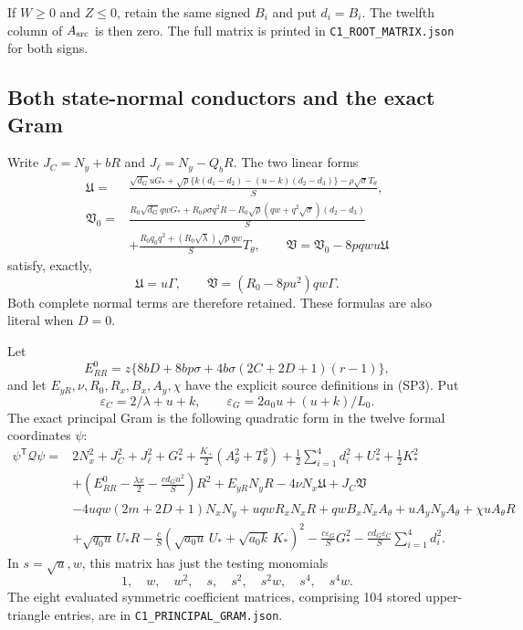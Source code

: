 If $W\ge0$ and $Z\le0$, retain the same signed $B_i$ and put $d_i=B_i$.
The twelfth column of $A_{\rm src}$ is then zero. The full matrix is
printed in \texttt{C1\_ROOT\_MATRIX.json} for both signs.

\subsection{Both state-normal conductors and the exact Gram}

Write $J_C=N_y+bR$ and $J_\ell=N_y-Q_bR$. The two linear forms
\begin{align*}
 \mathfrak U={}&\frac{\sqrt{d_G}uG_*
 +\sqrt\rho\{k(d_1-d_2)-(u-k)(d_2-d_3)\}
 -\rho\sqrt\sigma T_\theta}{S},\\
 \mathfrak V_0={}&\frac{R_0\sqrt{d_G}qwG_*+R_0\rho\sigma q^2R
 -R_0\sqrt\rho(qw+q^2\sqrt\sigma)(d_2-d_3)}{S}\\
 &+\frac{R_0q_0q^2+(R_0\sqrt\lambda)\sqrt\rho qw}{S}T_\theta,
 \qquad \mathfrak V=\mathfrak V_0-8pqwu\mathfrak U
\end{align*}
satisfy, exactly,
\[
 \mathfrak U=u\Gamma,\qquad
 \mathfrak V=(R_0-8pu^2)qw\Gamma.
\]
Both complete normal terms are therefore retained. These formulas
are also literal when $D=0$.

Let
\[
 E_{RR}^0=z\{8bD+8bp\sigma+4b\sigma(2C+2D+1)(r-1)\},
\]
and let $E_{yR},\nu,R_0,R_x,B_x,A_y,\chi$ have the explicit source
definitions in (SP3). Put
\[
 \varepsilon_C=2/\lambda+u+k,\qquad
 \varepsilon_G=2a_0u+(u+k)/L_0.
\]
The exact principal Gram is the following quadratic form in the
twelve formal coordinates $\psi$:
\begin{align*}
 \psi^{\mathsf T}\mathcal Q\psi={}&
 2N_x^2+J_C^2+J_\ell^2+G_*^2
 +\frac{K_+}{2}(A_\theta^2+T_\theta^2)
 +\frac12\sum_{i=1}^4d_i^2+U_*^2+\frac12K_*^2\\
 &+\left(E_{RR}^0-\frac{\lambda x}{2}-\frac{cd_Gu^2}{S}\right)R^2
 +E_{yR}N_yR-4\nu N_x\mathfrak U+J_C\mathfrak V\\
 &-4uqw(2m+2D+1)N_xN_y+uqwR_xN_xR
 +qwB_xN_xA_\theta+uA_yN_yA_\theta+\chi uA_\theta R\\
 &+\sqrt{q_0u}\,U_*R
 -\frac cS(\sqrt{a_0u}\,U_*+\sqrt{a_0k}\,K_*)^2
 -\frac{c\varepsilon_G}{S}G_*^2
 -\frac{cd_G\varepsilon_C}{S}\sum_{i=1}^4d_i^2.
\end{align*}
In $s=\sqrt u,w$, this matrix has just the testing monomials
\[
 1,\quad w,\quad w^2,\quad s,\quad s^2,\quad s^2w,
 \quad s^4,\quad s^4w.
\]
The eight evaluated symmetric coefficient matrices, comprising 104
stored upper-triangle entries, are in
\texttt{C1\_PRINCIPAL\_GRAM.json}.

